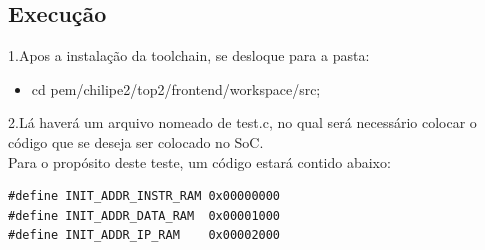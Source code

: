 \subsection{Execução}
\par 1.Apos a instalação da toolchain, se desloque para a pasta:

\begin{itemize}
  \item cd pem/chilipe2/top2/frontend/workspace/src;
\end{itemize}

\par 2.Lá haverá um arquivo nomeado de test.c, no qual será necessário colocar o código que se deseja ser colocado no SoC.
\\
Para o propósito deste teste, um código estará contido abaixo:
\begin{lstlisting}
#define INIT_ADDR_INSTR_RAM 0x00000000
#define INIT_ADDR_DATA_RAM  0x00001000
#define INIT_ADDR_IP_RAM    0x00002000


\end{lstlisting}
